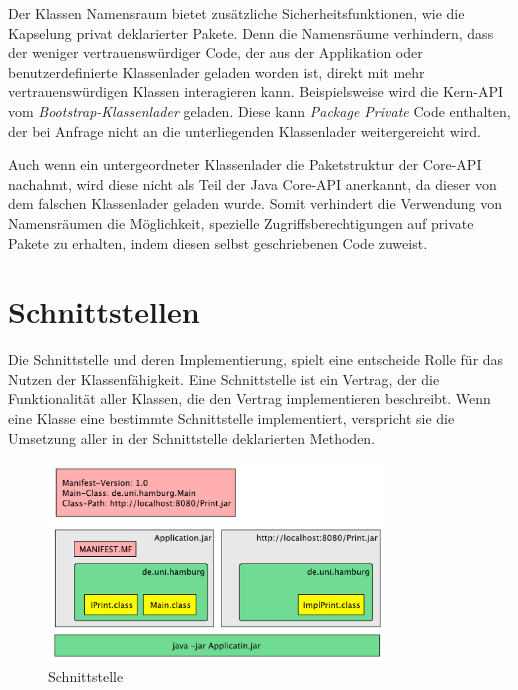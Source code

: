     Der Klassen Namensraum bietet zusätzliche Sicherheitsfunktionen, wie die Kapselung privat deklarierter Pakete. Denn die Namensräume verhindern, dass der weniger vertrauenswürdiger Code, der aus der Applikation oder benutzerdefinierte Klassenlader geladen worden ist, direkt mit mehr vertrauenswürdigen Klassen interagieren kann. Beispielsweise wird die Kern-API vom \textit{Bootstrap-Klassenlader} geladen. Diese kann \textit{Package Private} Code enthalten, der bei Anfrage nicht an die unterliegenden Klassenlader weitergereicht wird.


    Auch wenn ein untergeordneter Klassenlader die Paketstruktur der Core-API nachahmt, wird diese nicht als Teil der Java Core-API anerkannt, da dieser von dem falschen Klassenlader geladen wurde. Somit verhindert die Verwendung von Namensräumen die Möglichkeit, spezielle Zugriffsberechtigungen auf private Pakete zu erhalten, indem diesen selbst geschriebenen Code zuweist. \cite{Forman04javareflection}


\section{Schnittstellen} \label{sec:kap}
  
  Die Schnittstelle und deren Implementierung, spielt eine entscheide Rolle für das Nutzen der Klassenfähigkeit. Eine Schnittstelle ist ein Vertrag, der die Funktionalität aller Klassen, die den Vertrag implementieren beschreibt. Wenn eine Klasse eine bestimmte Schnittstelle implementiert, verspricht sie die Umsetzung aller in der Schnittstelle deklarierten Methoden.

  \begin{figure}[h!]
    \centering
    \includegraphics[width=0.8\textwidth]{material/images/Classpath-Interface-Implimentation.pdf}
    \caption{Schnittstelle}
    \label{fig:schnitt}
  \end{figure}

